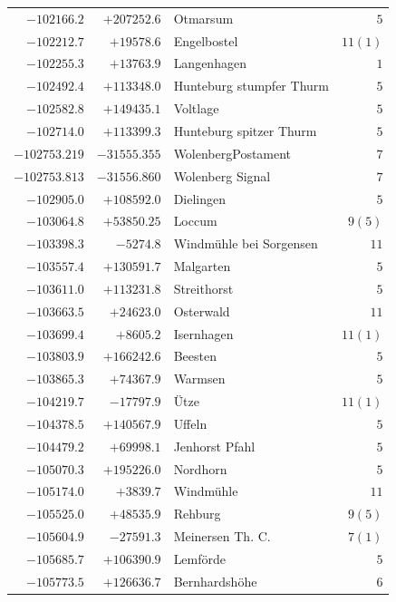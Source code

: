 \begin{center}
\begin{tabular}{r|r|p{170pt}|r}
\(-102166.2\)&\(+207252.6\)&Otmarsum&\(5\)\\
\(-102212.7\)&\(+19578.6\)&Engelbostel&\(11 (1)\)\\
\(-102255.3\)&\(+13763.9\)&Langenhagen&\(1\)\\
\(-102492.4\)&\(+113348.0\)&Hunteburg stumpfer Thurm&\(5\)\\
\(-102582.8\)&\(+149435.1\)&Voltlage&\(5\)\\
\(-102714.0\)&\(+113399.3\)&Hunteburg spitzer Thurm&\(5\)\\
\(-102753.219\)&\(-31555.355\)&WolenbergPostament&\(7\)\\
\(-102753.813\)&\(-31556.860\)&Wolenberg Signal&\(7\)\\
\(-102905.0\)&\(+108592.0\)&Dielingen&\(5\)\\
\(-103064.8\)&\(+53850.25\)&Loccum&\(9 (5)\)\\
\(-103398.3\)&\(-5274.8\)&Windmühle bei Sorgensen&\(11\)\\
\(-103557.4\)&\(+130591.7\)&Malgarten&\(5\)\\
\(-103611.0\)&\(+113231.8\)&Streithorst&\(5\)\\
\(-103663.5\)&\(+24623.0\)&Osterwald&\(11\)\\
\(-103699.4\)&\(+8605.2\)&Isernhagen&\(11 (1)\)\\
\(-103803.9\)&\(+166242.6\)&Beesten&\(5\)\\
\(-103865.3\)&\(+74367.9\)&Warmsen&\(5\)\\
\(-104219.7\)&\(-17797.9\)&Ütze&\(11 (1)\)\\
\(-104378.5\)&\(+140567.9\)&Uffeln&\(5\)\\
\(-104479.2\)&\(+69998.1\)&Jenhorst Pfahl&\(5\)\\
\(-105070.3\)&\(+195226.0\)&Nordhorn&\(5\)\\
\(-105174.0\)&\(+3839.7\)&Windmühle&\(11\)\\
\(-105525.0\)&\(+48535.9\)&Rehburg&\(9 (5)\)\\
\(-105604.9\)&\(-27591.3\)&Meinersen Th. C.&\(7 (1)\)\\
\(-105685.7\)&\(+106390.9\)&Lemförde&\(5\)\\
\(-105773.5\)&\(+126636.7\)&Bernhardshöhe&\(6\)\\
\hline\end{tabular}\endgroup\end{center}
\clearpage
